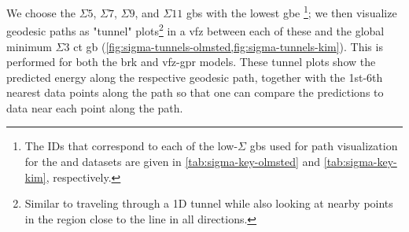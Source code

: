 \documentclass[final,twocolumn,12pt]{elsarticle}
\begin{document}
    We choose the $\Sigma5$, $\Sigma7$, $\Sigma9$, and $\Sigma11$ \glspl{gb} with the lowest \gls{gbe} \footnote{The IDs that correspond to each of the low-$\Sigma$ \glspl{gb} used for path visualization for the \citet{olmstedSurveyComputedGrain2009} and \citet{kimPhasefieldModeling3D2014} datasets are given in \cref{tab:sigma-key-olmsted} and \cref{tab:sigma-key-kim}, respectively. }; we then visualize geodesic paths as "tunnel" plots\footnote{Similar to traveling through a 1D tunnel while also looking at nearby points in the region close to the line in all directions.} in a \gls{vfz} between each of these and the global minimum $\Sigma3$ \gls{ct} \gls{gb} (\cref{fig:sigma-tunnels-olmsted,fig:sigma-tunnels-kim}). This is performed for both the \gls{brk} and \gls{vfz}-\gls{gpr} models. These tunnel plots show the predicted energy along the respective geodesic path, together with the 1st-6th nearest data points along the path so that one can compare the predictions to data near each point along the path.
\end{document}
